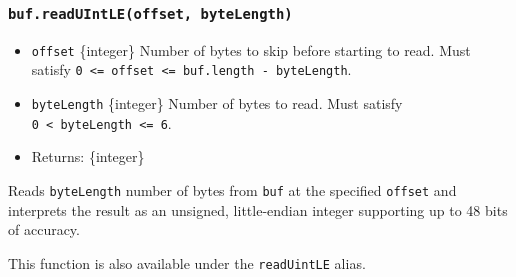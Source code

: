 \subsubsection{\texorpdfstring{\texttt{buf.readUIntLE(offset,\ byteLength)}}{buf.readUIntLE(offset, byteLength)}}\label{buf.readuintleoffset-bytelength}

\begin{itemize}
\tightlist
\item
  \texttt{offset} \{integer\} Number of bytes to skip before starting to
  read. Must satisfy
  \texttt{0\ \textless{}=\ offset\ \textless{}=\ buf.length\ -\ byteLength}.
\item
  \texttt{byteLength} \{integer\} Number of bytes to read. Must satisfy
  \texttt{0\ \textless{}\ byteLength\ \textless{}=\ 6}.
\item
  Returns: \{integer\}
\end{itemize}

Reads \texttt{byteLength} number of bytes from \texttt{buf} at the
specified \texttt{offset} and interprets the result as an unsigned,
little-endian integer supporting up to 48 bits of accuracy.

This function is also available under the \texttt{readUintLE} alias.

\begin{Shaded}
\begin{Highlighting}[]
\NormalTok{ \{ }\NormalTok{ \} } \OperatorTok{;}

\OperatorTok{=} \NormalTok{([}\OperatorTok{,} \OperatorTok{,} \OperatorTok{,} \OperatorTok{,} \OperatorTok{,} \NormalTok{])}\OperatorTok{;}

\NormalTok{(}\OperatorTok{,} \NormalTok{)}\NormalTok{(}\NormalTok{))}\OperatorTok{;}
\end{Highlighting}
\end{Shaded}

